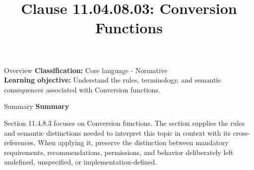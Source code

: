 \documentclass[10pt,letterpaper]{article}
\title{Clause 11.04.08.03: Conversion Functions}
\author{}
\date{}
\begin{document}
\maketitle
\begin{CornellOverviewBox}{Overview}
\textbf{Classification:} Core language - Normative\\[2pt]
\textbf{Learning objective:} Understand the rules, terminology, and semantic consequences associated with Conversion functions.
\end{CornellOverviewBox}\begin{CornellSummaryBox}{Summary}
{\sffamily\bfseries\color{Accent} Summary}\par\vspace{3pt}Section 11.4.8.3 focuses on Conversion functions. The section supplies the rules and semantic distinctions needed to interpret this topic in context with its cross-references. When applying it, preserve the distinction between mandatory requirements, recommendations, permissions, and behavior deliberately left undefined, unspecified, or implementation-defined.
\end{CornellSummaryBox}
\end{document}

